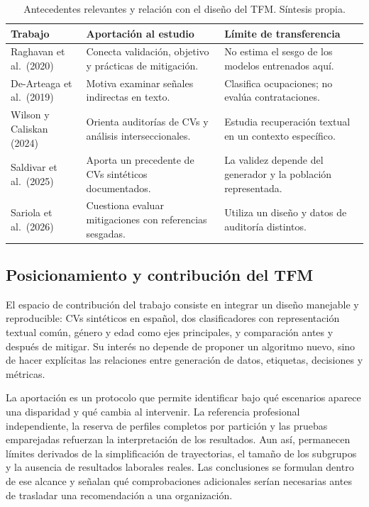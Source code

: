 \documentclass[11pt,a4paper,oneside]{report}
\begin{document}
\begin{table}[htbp]
\centering
\small
\setlength{\tabcolsep}{4pt}
\renewcommand{\arraystretch}{1.12}
\caption{Antecedentes relevantes y relación con el diseño del TFM. Síntesis propia.}
\label{tab:antecedentes}
\begin{tabularx}{\textwidth}{@{}p{2.7cm}XX@{}}
\toprule
\textbf{Trabajo} & \textbf{Aportación al estudio} & \textbf{Límite de transferencia}\\
\midrule
Raghavan et al.\ (2020) & Conecta validación, objetivo y prácticas de mitigación. & No estima el sesgo de los modelos entrenados aquí.\\
De-Arteaga et al.\ (2019) & Motiva examinar señales indirectas en texto. & Clasifica ocupaciones; no evalúa contrataciones.\\
Wilson y Caliskan (2024) & Orienta auditorías de CVs y análisis interseccionales. & Estudia recuperación textual en un contexto específico.\\
Saldivar et al.\ (2025) & Aporta un precedente de CVs sintéticos documentados. & La validez depende del generador y la población representada.\\
Sariola et al.\ (2026) & Cuestiona evaluar mitigaciones con referencias sesgadas. & Utiliza un diseño y datos de auditoría distintos.\\
\bottomrule
\end{tabularx}
\end{table}

\subsection{Posicionamiento y contribución del TFM}

El espacio de contribución del trabajo consiste en integrar un diseño manejable y reproducible: CVs sintéticos en español, dos clasificadores con representación textual común, género y edad como ejes principales, y comparación antes y después de mitigar. Su interés no depende de proponer un algoritmo nuevo, sino de hacer explícitas las relaciones entre generación de datos, etiquetas, decisiones y métricas.

La aportación es un protocolo que permite identificar bajo qué escenarios aparece una disparidad y qué cambia al intervenir. La referencia profesional independiente, la reserva de perfiles completos por partición y las pruebas emparejadas refuerzan la interpretación de los resultados. Aun así, permanecen límites derivados de la simplificación de trayectorias, el tamaño de los subgrupos y la ausencia de resultados laborales reales. Las conclusiones se formulan dentro de ese alcance y señalan qué comprobaciones adicionales serían necesarias antes de trasladar una recomendación a una organización.
\end{document}
